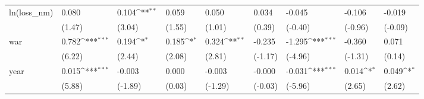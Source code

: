 \def\sym#1{\ifmmode^{#1}\else\(^{#1}\)\fi}
\begin{tabular}{p{1.5cm} p{2cm} p{1.7cm} p{1.7cm} p{1.7cm} p{1.7cm} p{1.7cm} p{1.7cm} p{1.7cm}}
\hline
ln(loss\_nm)     &    0.080         &    0.104\sym{**} &    0.059         &    0.050         &    0.034         &   -0.045         &   -0.106         &   -0.019         \\
                &   (1.47)         &   (3.04)         &   (1.55)         &   (1.01)         &   (0.39)         &  (-0.40)         &  (-0.96)         &  (-0.09)         \\
war             &    0.782\sym{***}&    0.194\sym{*}  &    0.185\sym{*}  &    0.324\sym{**} &   -0.235         &   -1.295\sym{***}&   -0.360         &    0.071         \\
                &   (6.22)         &   (2.44)         &   (2.08)         &   (2.81)         &  (-1.17)         &  (-4.96)         &  (-1.31)         &   (0.14)         \\
year            &    0.015\sym{***}&   -0.003         &    0.000         &   -0.003         &   -0.000         &   -0.031\sym{***}&    0.014\sym{*}  &    0.049\sym{*}  \\
                &   (5.88)         &  (-1.89)         &   (0.03)         &  (-1.29)         &  (-0.03)         &  (-5.96)         &   (2.65)         &   (2.62)         \\
\end{tabular}
